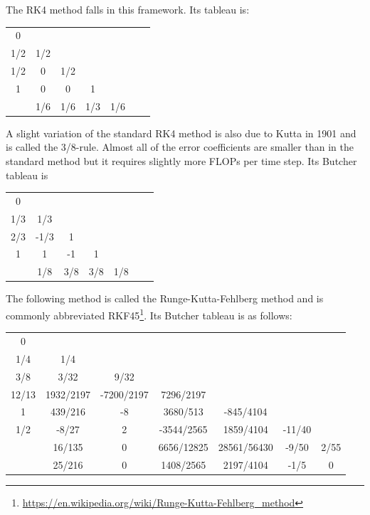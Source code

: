 The RK4 method falls in this framework. Its tableau is:

\begin{mdframed}[backgroundcolor=blue!5]
\begin{tabular}{c|cccccc}
0 & \\
1/2 & 1/2 \\
1/2 & 0 & 1/2 \\
1 & 0 & 0 & 1 \\
\hline
 & 1/6 & 1/6 & 1/3 & 1/6 
\end{tabular}
\end{mdframed}

A slight variation of the standard RK4 method is also due to Kutta in 1901 and is called the 3/8-rule. 
Almost all of the error coefficients are smaller than in the standard method but it requires slightly more FLOPs 
per time step. Its Butcher tableau is

\begin{mdframed}[backgroundcolor=blue!5]
\begin{tabular}{c|cccccc}
0 & \\
1/3 & 1/3 \\
2/3 & -1/3 & 1 \\
1 & 1 & -1 & 1 \\
\hline
 & 1/8 & 3/8 & 3/8 & 1/8 
\end{tabular}
\end{mdframed}


 
The following method is called the Runge-Kutta-Fehlberg method and is 
commonly abbreviated 
RKF45\footnote{\url{https://en.wikipedia.org/wiki/Runge-Kutta-Fehlberg_method}}. 
Its Butcher tableau is as follows: 

\begin{mdframed}[backgroundcolor=blue!5]
\begin{tabular}{c|cccccc}
0 & \\
1/4 	&1/4\\ 
3/8 	&3/32 		&9/32 \\
12/13 	&1932/2197 	&-7200/2197 &	7296/2197\\
1 	&439/216 	&-8 	&3680/513 &	-845/4104\\
1/2 	&-8/27 		&2 	&-3544/2565& 	1859/4104 &	-11/40 	\\
\hline
&16/135 	&0 		&6656/12825 	&28561/56430 	&-9/50& 	2/55\\
&25/216 	&0 	&1408/2565 	&2197/4104 	&-1/5 	&0 
\end{tabular}
\end{mdframed}


